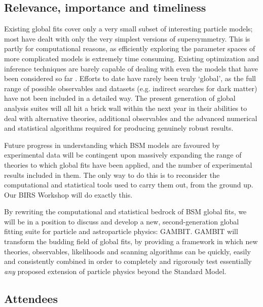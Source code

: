 \documentclass[a4paper,11pt]{article}
\begin{document}
\subsection*{Relevance, importance and timeliness}

Existing global fits \cite{IC22Methods, Fittino12, Mastercode12b, Roszkowski12, Strege13} cover only a very small subset of interesting particle models; most have dealt with only the very simplest versions of supersymmetry.  This is partly for computational reasons, as efficiently exploring the parameter spaces of more complicated models is extremely time consuming.  Existing optimization and inference techniques are barely capable of dealing with even the models that have been considered so far \cite{Akrami09,SBSpike}.  Efforts to date have rarely been truly `global', as the full range of possible observables and datasets (e.g. indirect searches for dark matter) have not been included in a detailed way.  The present generation of global analysis suites will all hit a brick wall within the next year in their abilities to deal with alternative theories, additional observables and the advanced numerical and statistical algorithms required for producing genuinely robust results.

Future progress in understanding which BSM models are favoured by experimental data will be contingent upon massively expanding the range of theories to which global fits have been applied, and the number of experimental results included in them.  The only way to do this is to reconsider the computational and statistical tools used to carry them out, from the ground up.  Our BIRS Workshop will do exactly this.  

By rewriting the computational and statistical bedrock of BSM global fits, we will be in a position to discuss and develop a new, second-generation global fitting suite for particle and astroparticle physics: GAMBIT.  GAMBIT will transform the budding field of global fits, by providing a framework in which new theories, observables, likelihoods and scanning algorithms can be quickly, easily and consistently combined in order to completely and rigorously test essentially \textit{any} proposed extension of particle physics beyond the Standard Model.

\subsection*{Attendees}
\end{document}
